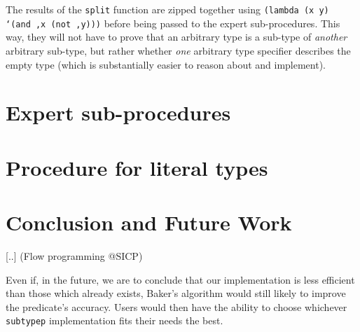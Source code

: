 \documentclass[format=sigconf]{acmart}
\newcommand\code[2][\small]{\sloppy\texttt{#1#2}}
\theoremstyle{definition}
\begin{document}
The results of the \code{split} function are zipped together using
\code{(lambda (x y) `(and ,x (not ,y)))} before being passed to the expert
sub-procedures. This way, they will not have to prove that an arbitrary type is a
sub-type of \emph{another} arbitrary sub-type, but rather whether \emph{one}
arbitrary type specifier describes the empty type (which is substantially
easier to reason about and implement).

\section{Expert sub-procedures}
\label{sec:exp}

\section{Procedure for literal types}

\section{Conclusion and Future Work}
[..] (Flow programming @SICP)

Even if, in the future, we are to conclude that our implementation is less
efficient than those which already exists, Baker's algorithm would still likely to
improve the predicate's accuracy. Users would then have the ability to
choose whichever \code{subtypep} implementation fits their needs the best.


\end{document}
